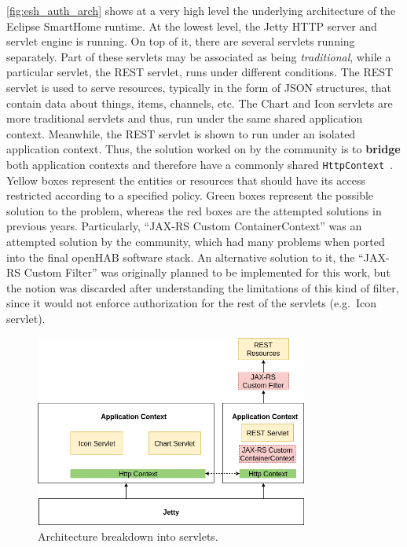 \documentclass[12pt]{article}
\begin{document}
\autoref{fig:esh_auth_arch} shows at a very high level the underlying architecture of the Eclipse SmartHome runtime. At the lowest level, the Jetty HTTP server and servlet engine is running. On top of it, there are several servlets running separately. Part of these servlets may be associated as being \emph{traditional}, while a particular servlet, the REST servlet, runs under different conditions. The REST servlet is used to serve resources, typically in the form of JSON structures, that contain data about things, items, channels, etc. The Chart and Icon servlets are more traditional servlets and thus, run under the same shared application context. Meanwhile, the REST servlet is shown to run under an isolated application context. Thus, the solution worked on by the community is to \textbf{bridge} both application contexts and therefore have a commonly shared \texttt{HttpContext}~\cite{esh_03}. Yellow boxes represent the entities or resources that should have its access restricted according to a specified policy. Green boxes represent the possible solution to the problem, whereas the red boxes are the attempted solutions in previous years. Particularly, ``JAX-RS Custom ContainerContext'' was an attempted solution by the community, which had many problems when ported into the final openHAB software stack. An alternative solution to it, the ``JAX-RS Custom Filter'' was originally planned to be implemented for this work, but the notion was discarded after understanding the limitations of this kind of filter, since it would not enforce authorization for the rest of the servlets (e.g.\ Icon servlet). 

\begin{figure} [ht] 
\begin{center}
\includegraphics[width=0.8\textwidth]{esh_auth_arch}
\caption{Architecture breakdown into servlets.}
\label{fig:esh_auth_arch}
\end{center}
\end{figure}
\end{document}
